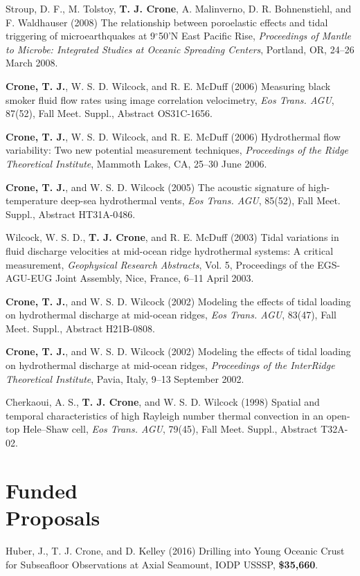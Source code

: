 \documentclass[11pt]{res}
\begin{document}
\begin{resume}
Stroup, D. F., M. Tolstoy, {\bf T. J. Crone}, A. Malinverno, D. R.  Bohnenstiehl, and F.  Waldhauser (2008) The relationship between poroelastic effects and tidal triggering of microearthquakes at 9$^\circ$50'N East Pacific Rise, {\em Proceedings of Mantle to Microbe: Integrated Studies at Oceanic Spreading Centers}, Portland, OR, 24--26 March 2008.

{\bf Crone, T. J.}, W. S. D. Wilcock, and R. E. McDuff (2006) Measuring black smoker fluid flow rates using image correlation velocimetry, {\em Eos Trans.  AGU}, 87(52), Fall Meet.  Suppl., Abstract OS31C-1656.

{\bf Crone, T. J.}, W. S. D. Wilcock, and R. E. McDuff (2006) Hydrothermal flow variability: Two new potential measurement techniques, {\em Proceedings of the Ridge Theoretical Institute}, Mammoth Lakes, CA, 25--30 June 2006. 

{\bf Crone, T. J.}, and W. S. D. Wilcock (2005) The acoustic signature of high-temperature deep-sea hydrothermal vents, {\em Eos Trans. AGU}, 85(52), Fall Meet. Suppl., Abstract HT31A-0486.

Wilcock, W. S. D., {\bf T. J. Crone}, and R. E. McDuff (2003) Tidal variations in fluid discharge velocities at mid-ocean ridge hydrothermal systems: A critical measurement, {\em Geophysical Research Abstracts}, Vol. 5, Proceedings of the EGS-AGU-EUG Joint Assembly, Nice, France, 6--11 April 2003.

{\bf Crone, T. J.}, and W. S. D. Wilcock (2002) Modeling the effects of tidal loading on hydrothermal discharge at mid-ocean ridges, {\em Eos Trans. AGU}, 83(47), Fall Meet.  Suppl., Abstract H21B-0808.

{\bf Crone, T. J.}, and W. S. D. Wilcock (2002) Modeling the effects of tidal loading on hydrothermal discharge at mid-ocean ridges, {\em Proceedings of the InterRidge Theoretical Institute}, Pavia, Italy, 9--13 September 2002.

Cherkaoui, A. S., {\bf T. J. Crone}, and W. S. D. Wilcock (1998) Spatial and temporal characteristics of high Rayleigh number thermal convection in an open-top Hele--Shaw cell, {\em Eos Trans. AGU}, 79(45), Fall Meet. Suppl., Abstract T32A-02.


\section{\sc Funded\\Proposals}
Huber, J., T. J. Crone, and D. Kelley (2016) Drilling into Young Oceanic Crust for Subseafloor Observations at Axial Seamount, IODP USSSP, {\bf \$35,660}.


\end{resume}
\end{document}
